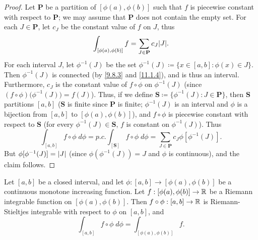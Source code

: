 \begin{proof}
  Let \(\mathbf{P}\) be a partition of \([\phi(a), \phi(b)]\) such that \(f\) is piecewise constant with respect to \(\mathbf{P}\);
  we may assume that \(\mathbf{P}\) does not contain the empty set.
  For each \(J \in \mathbf{P}\), let \(c_J\) be the constant value of \(f\) on \(J\), thus
  \[
    \int_{[\phi(a), \phi(b)]} f = \sum_{J \in \mathbf{P}} c_J \abs{J}.
  \]
  For each interval \(J\), let \(\phi^{-1}(J)\) be the set \(\phi^{-1}(J) \coloneqq \{x \in [a, b] : \phi(x) \in J\}\).
  Then \(\phi^{-1}(J)\) is connected (by \cref{9.8.3} and \cref{11.1.4}), and is thus an interval.
  Furthermore, \(c_J\) is the constant value of \(f \circ \phi\) on \(\phi^{-1}(J)\) (since \((f \circ \phi)\big(\phi^{-1}(J)\big) = f(J)\)).
  Thus, if we define \(\mathbf{S} \coloneqq \{\phi^{-1} (J) : J \in \mathbf{P}\}\), then \(\mathbf{S}\) partitions \([a, b]\)
  (\(\mathbf{S}\) is finite since \(\mathbf{P}\) is finite;
  \(\phi^{-1}(J)\) is an interval and \(\phi\) is a bijection from \([a, b]\) to \([\phi(a), \phi(b)]\)),
  and \(f \circ \phi\) is piecewise constant with respect to \(\mathbf{S}\) (for every \(\phi^{-1}(J) \in \mathbf{S}\), \(f\) is constant on \(\phi^{-1}(J)\)).
  Thus
  \[
    \int_{[a, b]} f \circ \phi \; d \phi = p.c. \int_{[\mathbf{S}]} f \circ \phi \; d \phi = \sum_{J \in \mathbf{P}} c_J \phi[\phi^{-1}(J)].
  \]
  But \(\phi[\phi^{-1}(J)] = \left\lvert J\right\rvert\) (since \(\phi(\phi^{-1}(J)) = J\) and \(\phi\) is continuous), and the claim follows.
\end{proof}

\begin{prop}\label{11.10.6}
  Let \([a, b]\) be a closed interval, and let \(\phi : [a, b] \to [\phi(a), \phi(b)]\) be a continuous monotone increasing function.
  Let \(f : [\phi(a), \phi(b)] \to \mathbb{R}\) be a Riemann integrable function on \([\phi(a), \phi(b)]\).
  Then \(f \circ \phi : [a, b] \to \mathbb{R}\) is Riemann-Stieltjes integrable with respect to \(\phi\) on \([a, b]\), and
  \[
    \int_{[a, b]} f \circ \phi \; d \phi = \int_{[\phi(a), \phi(b)]} f.
  \]
\end{prop}

